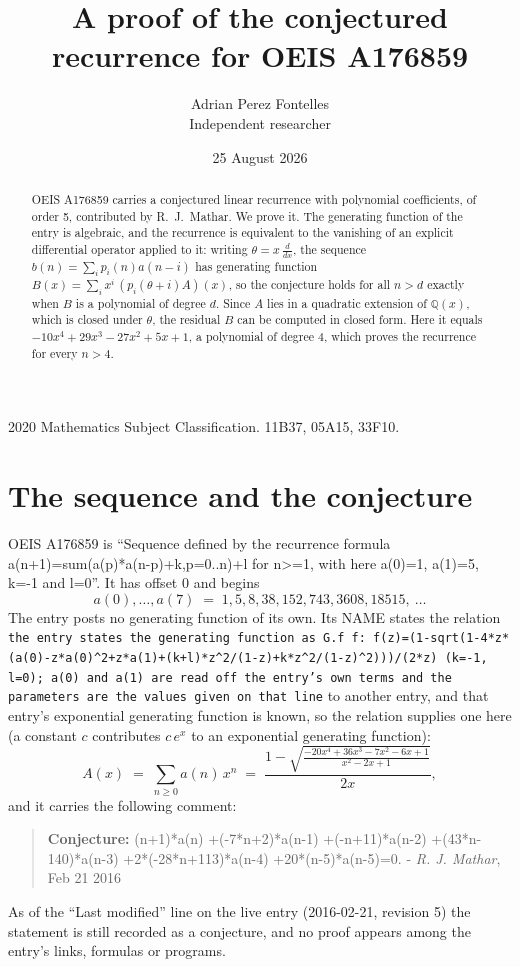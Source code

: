 \documentclass[11pt,a4paper]{article}
\title{A proof of the conjectured recurrence for OEIS A176859}
\author{Adrian Perez Fontelles\\ \small Independent researcher}
\date{25 August 2026}
\theoremstyle{plain}
\theoremstyle{definition}
\begin{document}
\maketitle

\begin{abstract}
OEIS A176859 carries a conjectured linear recurrence with polynomial coefficients, of
order 5, contributed by R.~J.~Mathar. We prove it. The generating function of the
entry is algebraic, and the recurrence is equivalent to the vanishing of an explicit
differential operator applied to it: writing $\theta=x\,\frac{d}{dx}$, the sequence
$b(n)=\sum_{i}p_{i}(n)a(n-i)$ has generating function
$B(x)=\sum_{i}x^{i}\,(p_{i}(\theta+i)A)(x)$, so the conjecture holds for all $n>d$ exactly
when $B$ is a polynomial of degree $d$. Since $A$ lies in a quadratic extension of
$\mathbb{Q}(x)$, which is closed under $\theta$, the residual $B$ can be computed in
closed form. Here it equals $- 10 x^{4} + 29 x^{3} - 27 x^{2} + 5 x + 1$, a polynomial of degree $4$, which proves
the recurrence for every $n>4$.
\end{abstract}

\noindent\small 2020 Mathematics Subject Classification. 11B37, 05A15, 33F10.\normalsize

\section{The sequence and the conjecture}

OEIS A176859 is ``Sequence defined by the recurrence formula a(n+1)=sum(a(p)*a(n-p)+k,p=0..n)+l for n>=1, with here a(0)=1, a(1)=5, k=-1 and l=0''. It has offset $0$ and begins
\[
a(0),\dots,a(7)\;=\;1, 5, 8, 38, 152, 743, 3608, 18515,\ \dots
\]
The entry posts no generating function of its own. Its NAME states the
relation \texttt{the entry states the generating function as G.f f: f(z)=(1-sqrt(1-4*z*(a(0)-z*a(0)\textasciicircum{}2+z*a(1)+(k+l)*z\textasciicircum{}2/(1-z)+k*z\textasciicircum{}2/(1-z)\textasciicircum{}2)))/(2*z) (k=-1, l=0); a(0) and a(1) are read off the entry's own terms and the parameters are the values given on that line} to another entry, and that entry's exponential generating
function is known, so the relation supplies one here (a constant $c$ contributes
$c\,e^{x}$ to an exponential generating function):
\begin{equation}\label{eq:gf}
A(x)\;=\;\sum_{n\ge 0} a(n)\,x^{n}\;=\;\frac{1 - \sqrt{\frac{- 20 x^{4} + 36 x^{3} - 7 x^{2} - 6 x + 1}{x^{2} - 2 x + 1}}}{2 x} ,
\end{equation}
and it carries the following comment:
\begin{quote}\small
\textbf{Conjecture:} (n+1)*a(n) +(-7*n+2)*a(n-1) +(-n+11)*a(n-2) +(43*n-140)*a(n-3) +2*(-28*n+113)*a(n-4) +20*(n-5)*a(n-5)=0. - \emph{R. J. Mathar}, Feb 21 2016
\end{quote}
As of the ``Last modified'' line on the live entry (2016-02-21, revision 5) the
statement is still recorded as a conjecture, and no proof appears among the entry's links,
formulas or programs.
\end{document}
